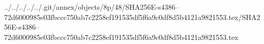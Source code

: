 ../../../../../.git/annex/objects/8p/48/SHA256E-s4386--72d6000985e03fbccc750ab7c2258ef191535df5f6a9c0df8d5b4121a9821553.tex/SHA256E-s4386--72d6000985e03fbccc750ab7c2258ef191535df5f6a9c0df8d5b4121a9821553.tex